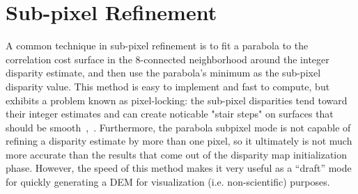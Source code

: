\section{Sub-pixel Refinement}
\label{sec:subpixel}



A common technique in sub-pixel refinement is to fit a parabola to the
correlation cost surface in the 8-connected neighborhood around the
integer disparity estimate, and then use the parabola's minimum as the
sub-pixel disparity value. This method is easy to implement and fast
to compute, but exhibits a problem known as pixel-locking: the
sub-pixel disparities tend toward their integer estimates and can
create noticable "stair steps" on surfaces that should be
smooth~\cite{Stein06:attenuating},~\cite{Szeliski03sampling}.
Furthermore, the parabola subpixel mode is not capable of refining a
disparity estimate by more than one pixel, so it ultimately is not
much more accurate than the results that come out of the disparity map
initialization phase.  However, the speed of this method makes it very
useful as a ``draft'' mode for quickly generating a DEM for
visualization (i.e. non-scientific) purposes.


